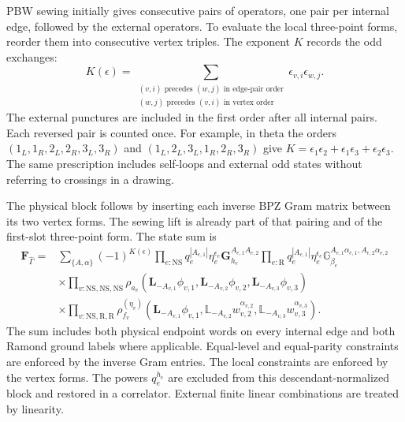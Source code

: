 \documentclass[11pt]{article}
\newcommand{\NS}{\mathrm{NS}}
\newcommand{\R}{\mathrm R}
\numberwithin{equation}{section}
\begin{document}
PBW sewing initially gives consecutive pairs of operators, one pair per
internal edge, followed by the external operators. To evaluate the local
three-point forms, reorder them into consecutive vertex triples.
The exponent $K$ records the odd exchanges:
\begin{equation}
 K(\epsilon)=\sum_{\substack{
 (v,i)\text{ precedes }(w,j)\text{ in edge-pair order}\\
 (w,j)\text{ precedes }(v,i)\text{ in vertex order}}}
                         \epsilon_{v,i}\epsilon_{w,j}.
 \label{eq:graph-sign}
\end{equation}
The external punctures are included in the first order after all internal
pairs. Each reversed pair is counted once. For example, in theta the
orders $(1_L,1_R,2_L,2_R,3_L,3_R)$ and
$(1_L,2_L,3_L,1_R,2_R,3_R)$ give
$K=\epsilon_1\epsilon_2+\epsilon_1\epsilon_3+\epsilon_2\epsilon_3$.
The same prescription includes self-loops and external odd states without
referring to crossings in a drawing.

The physical block follows by inserting each inverse BPZ Gram matrix
between its two vertex forms. The sewing lift is already part of that
pairing and of the first-slot three-point form. The state sum is
\begin{align}
 \mathbf F_{\hat\Gamma}={}&\sum_{\{A,\alpha\}}(-1)^{K(\epsilon)}
 \prod_{e:\NS}q_e^{|A_{e,1}|}\eta_e^{\epsilon_e}
            \mathbf G_{h_e}^{A_{e,1}A_{e,2}}
 \prod_{e:\R}q_e^{|A_{e,1}|}\eta_e^{\epsilon_e}
            \mathbb G_{\beta_e}^{A_{e,1}\alpha_{e,1},A_{e,2}\alpha_{e,2}}
 \nonumber\\
 &\times\prod_{v:\NS,\NS,\NS}
 \rho_{a_v}(\mathbf L_{-A_{v,1}}\phi_{v,1},
            \mathbf L_{-A_{v,2}}\phi_{v,2},
            \mathbf L_{-A_{v,3}}\phi_{v,3})\nonumber\\
 &\times\prod_{v:\NS,\R,\R}
 \rho_{f_v}^{(\eta_v)}(\mathbf L_{-A_{v,1}}\phi_{v,1},
            \mathbb L_{-A_{v,2}}w_{v,2}^{\alpha_{v,2}},
            \mathbb L_{-A_{v,3}}w_{v,3}^{\alpha_{v,3}}).
 \label{eq:physical-block}
\end{align}
The sum includes both physical endpoint words on every internal edge and
both Ramond ground labels where applicable. Equal-level and equal-parity
constraints are enforced by the inverse Gram entries. The local
constraints are enforced by the vertex forms. The powers $q_e^{h_e}$
are excluded from this descendant-normalized block and restored in a
correlator. External finite linear combinations are treated by linearity.
\end{document}
